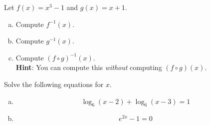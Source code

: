 \documentclass[12pt]{amsart}
\begin{document}
\newpage

\begin{thm}[20 Points]\label{ex4}
  Let $f(x) = x^3 - 1$ and $g(x) = x + 1$.
  \begin{enumerate}[(a)]
  \item
    Compute $f^{-1}(x)$.
    \vspace{2in}
  \item
    Compute $g^{-1}(x)$.
    \vspace{2in}
  \item
    Compute $(f \circ g)^{-1}(x)$.\\
    {\bf Hint}: You can compute this {\it without} computing $(f \circ g)(x)$.
  \end{enumerate}
\end{thm}

\newpage

\begin{thm}[20 Points]\label{ex5}
  Solve the following equations for $x$.
  \begin{enumerate}[(a)]
  \item
    $$ \log_6(x-2) + \log_6(x - 3) = 1$$
    \vspace{3.5in}
  \item
    $$e^{2x} - 1 = 0$$
  \end{enumerate}
\end{thm}
\end{document}
